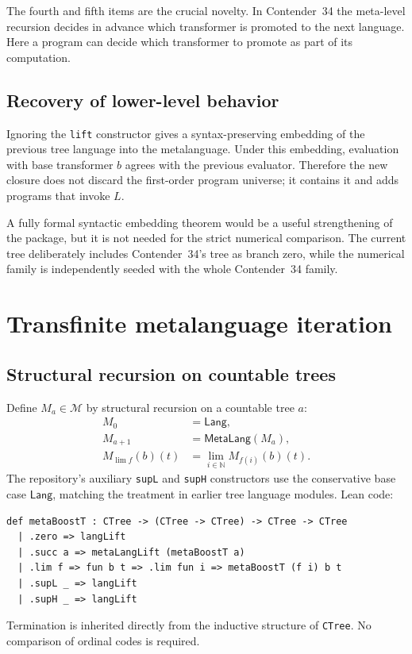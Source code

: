 \documentclass[11pt]{article}
\theoremstyle{definition}
\newcommand{\Nat}{\mathbb{N}}
\newcommand{\MOp}{\mathcal{M}}
\newcommand{\Lang}{\mathsf{Lang}}
\newcommand{\MetaLang}{\mathsf{MetaLang}}
\newcommand{\code}[1]{\texttt{#1}}
\begin{document}
The fourth and fifth items are the crucial novelty.  In Contender~34 the
meta-level recursion decides in advance which transformer is promoted to the
next language.  Here a program can decide which transformer to promote as part
of its computation.

\subsection{Recovery of lower-level behavior}

Ignoring the \code{lift} constructor gives a syntax-preserving embedding of the
previous tree language into the metalanguage.  Under this embedding, evaluation
with base transformer \(b\) agrees with the previous evaluator.  Therefore the
new closure does not discard the first-order program universe; it contains it
and adds programs that invoke \(L\).

A fully formal syntactic embedding theorem would be a useful strengthening of
the package, but it is not needed for the strict numerical comparison.  The
current tree deliberately includes Contender~34's tree as branch zero, while
the numerical family is independently seeded with the whole Contender~34
family.

\section{Transfinite metalanguage iteration}

\subsection{Structural recursion on countable trees}

Define \(M_a\in\MOp\) by structural recursion on a countable tree \(a\):
\[
\begin{aligned}
  M_0 &= \Lang,\\
  M_{a+1} &= \MetaLang(M_a),\\
  M_{\lim f}(b)(t) &= \lim_{i\in\Nat} M_{f(i)}(b)(t).
\end{aligned}
\]
The repository's auxiliary \code{supL} and \code{supH} constructors use the
conservative base case \(\Lang\), matching the treatment in earlier tree
language modules.  Lean code:
\begin{lstlisting}
def metaBoostT : CTree -> (CTree -> CTree) -> CTree -> CTree
  | .zero => langLift
  | .succ a => metaLangLift (metaBoostT a)
  | .lim f => fun b t => .lim fun i => metaBoostT (f i) b t
  | .supL _ => langLift
  | .supH _ => langLift
\end{lstlisting}
Termination is inherited directly from the inductive structure of
\code{CTree}.  No comparison of ordinal codes is required.
\end{document}
